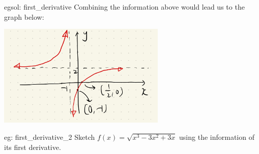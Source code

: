 \begin{egsol}[]{egsol: first_derivative}
    Combining the information above would lead us to the graph below:
    \begin{center}
        \includegraphics[width = 0.6\textwidth]{figures/chap 05/eg_first_derivative.png}
        \label{fig: eg_first_derivative}
    \end{center}
\end{egsol}

\begin{eg}[]{eg: first_derivative_2}
    Sketch $f(x)=\sqrt{x^3-3x^2+3x}$ using the information of its first derivative.
\end{eg}


